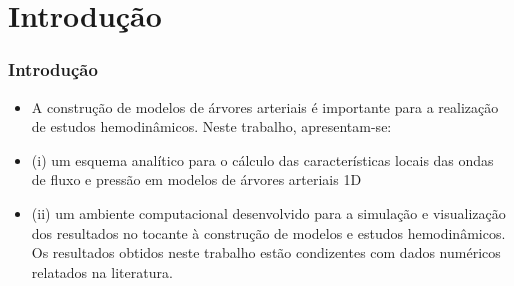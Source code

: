 \documentclass[10pt]{beamer}
\theoremstyle{remark}
\theoremstyle{definition}
\begin{document}
\section{Introdução}
\begin{frame}[allowframebreaks]
\frametitle{Introdução}

\begin{itemize}
	\item A construção de modelos de árvores arteriais é importante para a realização de estudos hemodinâmicos. Neste trabalho, apresentam-se: 
	\item (i) um esquema analítico para o cálculo das características locais das ondas de fluxo e pressão em modelos de árvores arteriais 1D 
	\item (ii) um ambiente computacional desenvolvido para a simulação e visualização dos resultados no tocante à construção de modelos e estudos hemodinâmicos. Os resultados obtidos neste trabalho estão condizentes com dados numéricos relatados na literatura.
	
\end{itemize}

\end{frame}
\end{document}
